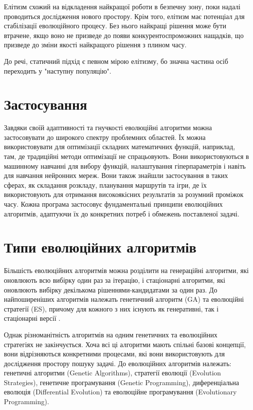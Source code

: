Елітизм схожий на відкладення найкращої роботи в безпечну зону,
поки надалі проводиться дослідження нового простору.
Крім того, елітизм має потенціал для стабілізації
еволюційного процесу.
Без нього найкращі рішення може бути втрачене,
якщо воно не призведе до появи конкурентоспроможних нащадків,
що призведе до зміни якості найкращого рішення з плином часу. 

До речі, статичний підхід є певном мірою елітизму, бо значна частина
осіб переходить у "наступну популяцію".




\section{Застосування}

Завдяки своїй адаптивності та гнучкості еволюційні алгоритми можна 
застосовувати до широкого спектру проблемних областей. Їх можна 
використовувати для оптимізації складних математичних функцій, 
наприклад, там, де традиційні методи оптимізації не спрацьовують. 
Вони використовуються в машинному навчанні для вибору функцій, 
налаштування гіперпараметрів і навіть для навчання нейронних мереж. 
Вони також знайшли застосування в таких сферах, як складання розкладу, 
планування маршрутів та ігри, де їх використовують для отримання 
високоякісних результатів за розумний проміжок часу. 
Кожна програма застосовує фундаментальні принципи еволюційних алгоритмів, 
адаптуючи їх до конкретних потреб і обмежень поставленої задачі.

\section{Типи еволюційних алгоритмів}

Більшість еволюційних алгоритмів можна розділити на 
генераційні алгоритми, які оновлюють всю вибірку один раз за ітерацію,
і стаціонарні алгоритми, які оновлюють вибірку декількома рішеннями-кандидатами 
за один раз. 
До найпоширеніших алгоритмів належать генетичний алгоритм (GA) та 
еволюційні стратегії (ES), причому для кожного з них існують як генеративні,
так і стаціонарні версії \cite{luke_essentials_2013}.

Однак різноманітність алгоритмів на одним генетичних та еволюційних
стратегіях не закінчується. 
Хоча всі ці алгоритми мають спільні базові концепції, 
вони відрізняються конкретними процесами, 
які вони використовують для дослідження простору пошуку задачі. 
До еволюційних алгоритмів належать:
генетичні алгоритми (Genetic Algorithms),
стратегії еволюції (Evolution Strategies),
генетичне програмування (Genetic Programming),
диференціальна еволюція (Differential Evolution) 
та еволюційне програмування (Evolutionary Programming).


